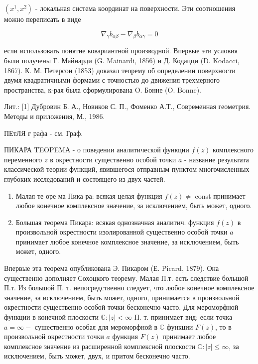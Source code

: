 \documentclass[10pt]{article}
\begin{document}
$\left(x^{1}, x^{2}\right)$ - локальная система координат на поверхности. Эти соотношения можно переписать в виде



\[

\nabla_{\gamma} b_{\alpha \beta}-\nabla_{\beta} b_{\alpha \gamma}=0

\]



если использовать понятие ковариантной производной. Впервые эти условия были получены Г. Майнарди (G. Mainardi, 1856) и Д. Кодацци (D. Kodacci, 1867). К. М. Петерсон (1853) доказал теорему об определении поверхности двумя квадратичными формами с точностью до движения трехмерного пространства, к-рая была сформулирована O. Бонне (O. Bonne).



Лит.: [1] Дубровин Б. А., Новиков С. П., Фоменко А.Т., Современная геометрия. Методы и приложения, М., 1986.



ПЕтЛЯ г рафа - см. Граф.



ПИКАРА TEOPEMА - о поведении аналитической функции $f(z)$ комплексного переменного $z$ в окрестности существенно особой точки $a$ - название результата классической теории функций, явившегося отправным пунктом многочисленных глубоких исследований и состоящего из двух частей.



\begin{enumerate}

  \item Малая те оре ма Пика ра: всякая целая функция $f(z) \neq$ const принимает любое конечное комплексное значение, за исключением, быть может, одного.



  \item Большая теорема Пикара: всякая однозначная аналитич. функция $f(z)$ в произвольной окрестности изолированной существенно особой точки $a$ принимает любое конечное комплексное значение, за исключением, быть может, одного.



\end{enumerate}



Впервые эта теорема опубликована Э. Пикаром (Е. Picard, 1879). Она существенно дополняет Сохоцкого теорему. Малая П.т. есть следствие большой П.т. Из большой П. т. непосредственно следует, что любое конечное комплексное значение, за исключением, быть может, одного, принимается в произвольной окрестности существенно особой точки бесконечно часто. Для мероморфной функции в конечной плоскости $\mathbb{C}:|z|<\infty$ П. т. принимает вид: если точка $a=\infty-$ сушественно особая для мероморфной в $\mathbb{C}$ функции $F(z)$, то в произвольной окрестности точки $a$ функция $F(z)$ принимает любое комплексное значение из расширенной комплексной плоскости $\mathbb{C}:|z| \leqslant \infty$, за исключением, быть может, двух, и притом бесконечно часто.
\end{document}
